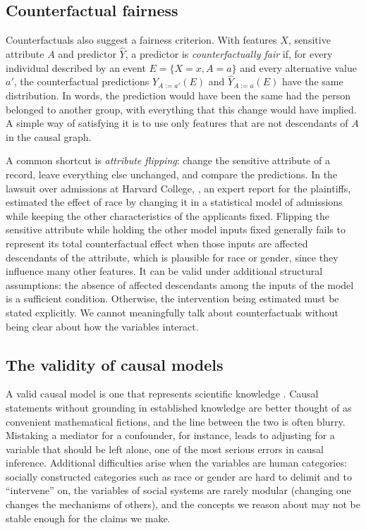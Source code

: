\subsection{Counterfactual fairness}

Counterfactuals also suggest a fairness criterion. With features $X$, sensitive attribute $A$ and
predictor $\hat Y$, a predictor is \emph{counterfactually fair} \citep{kusner2017counterfactual}
if, for every individual described by an event $E=\{X=x,A=a\}$ and every alternative value $a'$,
the counterfactual predictions $\hat Y_{A:=a'}(E)$ and $\hat Y_{A:=a}(E)$ have the same
distribution. In words, the prediction would have been the same had the person belonged to another group,
with everything that this change would have implied. A simple way of satisfying it is to use
only features that are not descendants of $A$ in the causal graph.

A common shortcut is \emph{attribute flipping}: change the sensitive attribute of a record, leave
everything else unchanged, and compare the predictions. In the lawsuit over admissions at Harvard
College, \citet{arcidiacono2017expert}, an expert report for the plaintiffs, estimated the effect of race by changing it in a statistical model of
admissions while keeping the other characteristics of the applicants fixed. Flipping the sensitive
attribute while holding the other model inputs fixed generally fails to represent its total counterfactual effect
when those inputs are affected descendants of the attribute, which is plausible for race or gender, since they
influence many other features. It can be valid under additional structural assumptions: the absence of affected
descendants among the inputs of the model is a sufficient condition. Otherwise, the intervention being estimated
must be stated explicitly. We cannot meaningfully
talk about counterfactuals without being clear about how the variables interact.

\subsection{The validity of causal models}

A valid causal model is one that represents scientific knowledge \citep{pearl2018book}. Causal
statements without grounding in established knowledge are better thought of as convenient
mathematical fictions, and the line between the two is often blurry. Mistaking a mediator for a
confounder, for instance, leads to adjusting for a variable that should be left alone, one of the
most serious errors in causal inference. Additional difficulties arise when the variables are
human categories: socially constructed categories such as race or gender are hard to delimit and
to ``intervene'' on, the variables of social systems are rarely modular (changing one changes the
mechanisms of others), and the concepts we reason about may not be stable enough for the claims we
make.

